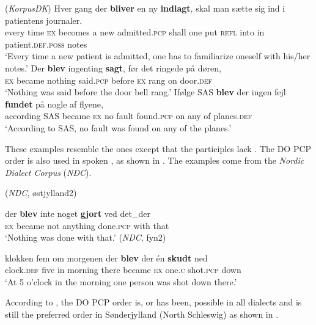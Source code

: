 \documentclass[output=paper]{LSP/langsci}
\begin{document}
\ea%
    \label{ex:engdahl:14}
     (\textit{KorpusDK})
\ea \label{ex:engdahl:14a}
\gll Hver   gang {der} \textbf{bliver} en   ny \textbf{indlagt}, skal man sætte sig   ind i   patientens  journaler.\\
every time  \textsc{ex} becomes a new admitted.\textsc{pcp} shall one  put  \textsc{refl} into in  patient.\textsc{def.poss} notes\\
    \glt ‘Every time a new patient is admitted, one has to familiarize oneself with his/her notes.’
\ex\label{ex:engdahl:14b}
\gll     Der \textbf{blev}     ingenting \textbf{sagt},    før  det ringede   på   døren,\\
  \textsc{ex} became  nothing    said\textsc{.pcp} before \textsc{ex} rang on  door\textsc{.def}\\
  \glt ‘Nothing was said before the  door bell rang.'
\ex\label{ex:engdahl:14c}
\gll  Ifølge    SAS \textbf{blev} der ingen fejl \textbf{fundet}     på nogle af flyene,\\
     according  SAS  became  \textsc{ex}  no    fault  found\textsc{.pcp}  on  any  of  planes.\textsc{def}\\
     \glt ‘According to SAS, no fault was found on any of the planes.'
\z
\z

\noindent These examples resemble the  ones except that the participles lack . The DO PCP order is also used in spoken , as shown in . The examples come from the \textit{Nordic Dialect Corpus} (\textit{NDC}).

\ea%
    \label{ex:engdahl:15}
    
    \ea
      (\textit{NDC}, østjylland2)
    
\gll  der \textbf{blev} inte   noget \textbf{gjort} ved det\_der \\
	\textsc{ex}  became not anything done.\textsc{pcp} with that \\
    \glt ‘Nothing was done with that.'
\ex\label{ex:engdahl:15b}
   (\textit{NDC}, fyn2)

\gll     klokken   fem     om morgenen der     \textbf{blev}     der én     \textbf{skudt}     ned  \\
  {clock.}\textsc{def}  five  in  morning    there    became \textsc{ex} {one}\textsc{.c} {shot.}\textsc{pcp} {down}\\
  \glt ‘At 5 o’clock in the morning one person was shot down there.’
\z
\z

\noindent According to \citet{Pedersen2017}, the DO PCP order is, or has been, possible in all  dialects and is still the preferred order in Sønderjylland (North Schleswig) as shown in .
\end{document}
